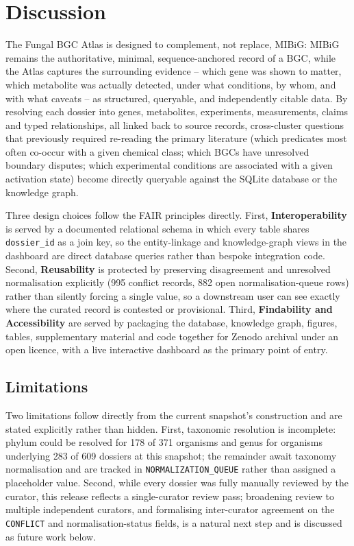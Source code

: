 \section{Discussion}

The Fungal BGC Atlas is designed to complement, not replace, MIBiG: MIBiG remains the authoritative,
minimal, sequence-anchored record of a BGC, while the Atlas captures the surrounding evidence --
which gene was shown to matter, which metabolite was actually detected, under what conditions, by
whom, and with what caveats -- as structured, queryable, and independently citable data. By
resolving each dossier into genes, metabolites, experiments, measurements, claims and typed
relationships, all linked back to source records, cross-cluster questions that previously required
re-reading the primary literature (which predicates most often co-occur with a given chemical class;
which BGCs have unresolved boundary disputes; which experimental conditions are associated with a
given activation state) become directly queryable against the SQLite database or the knowledge
graph.

Three design choices follow the FAIR principles \citep{wilkinson2016fair} directly. First,
\textbf{Interoperability} is served by a documented relational schema in which every table shares
\texttt{dossier\_id} as a join key, so the entity-linkage and knowledge-graph views in the dashboard
are direct database queries rather than bespoke integration code. Second, \textbf{Reusability} is
protected by preserving disagreement and unresolved normalisation explicitly (995 conflict records,
882 open normalisation-queue rows) rather than silently forcing a single value, so a downstream user
can see exactly where the curated record is contested or provisional. Third, \textbf{Findability and
Accessibility} are served by packaging the database, knowledge graph, figures, tables, supplementary
material and code together for Zenodo archival under an open licence, with a live interactive
dashboard as the primary point of entry.

\subsection{Limitations}

Two limitations follow directly from the current snapshot's construction and are stated explicitly
rather than hidden. First, taxonomic resolution is incomplete: phylum could be resolved for 178 of
371 organisms and genus for organisms underlying 283 of 609 dossiers at this snapshot; the remainder
await taxonomy normalisation and are tracked in \texttt{NORMALIZATION\_QUEUE} rather than assigned a
placeholder value. Second, while every dossier was fully manually reviewed by the curator, this
release reflects a single-curator review pass; broadening review to multiple independent curators,
and formalising inter-curator agreement on the \texttt{CONFLICT} and normalisation-status fields,
is a natural next step and is discussed as future work below.

